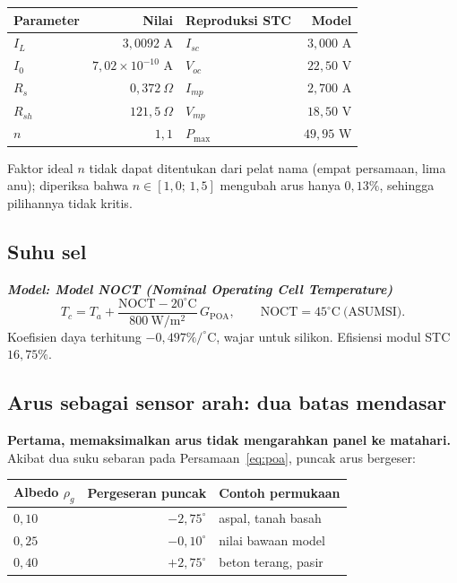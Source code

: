 \documentclass[11pt,a4paper]{article}
\newcommand{\degg}{^\circ}
\newcommand{\model}[1]{\textbf{\textit{Model: #1}}}
\begin{document}
\begin{longtable}{l r l r}
\toprule
\textbf{Parameter} & \textbf{Nilai} & \textbf{Reproduksi STC} & \textbf{Model} \\
\midrule
$I_L$ & $3{,}0092$ A & $I_{sc}$ & $3{,}000$ A \\
$I_0$ & $7{,}02\times10^{-10}$ A & $V_{oc}$ & $22{,}50$ V \\
$R_s$ & $0{,}372\ \Omega$ & $I_{mp}$ & $2{,}700$ A \\
$R_{sh}$ & $121{,}5\ \Omega$ & $V_{mp}$ & $18{,}50$ V \\
$n$ & $1{,}1$ & $P_{\max}$ & $49{,}95$ W \\
\bottomrule
\end{longtable}

Faktor ideal $n$ tidak dapat ditentukan dari pelat nama (empat persamaan, lima anu); diperiksa bahwa
$n \in [1{,}0;\,1{,}5]$ mengubah arus hanya $0{,}13\%$, sehingga pilihannya tidak kritis.

\subsection{Suhu sel}

\model{Model NOCT (Nominal Operating Cell Temperature)}
\begin{equation}
T_c = T_a + \frac{\mathrm{NOCT} - 20\degg\mathrm{C}}{800\ \mathrm{W/m^2}}\, G_{\mathrm{POA}},
\qquad \mathrm{NOCT} = 45\degg\mathrm{C} \ \text{(ASUMSI)}.
\end{equation}
Koefisien daya terhitung $-0{,}497\%/\degg$C, wajar untuk silikon. Efisiensi modul STC $16{,}75\%$.

\subsection{Arus sebagai sensor arah: dua batas mendasar}

\textbf{Pertama, memaksimalkan arus tidak mengarahkan panel ke matahari.} Akibat dua suku sebaran pada
Persamaan~\eqref{eq:poa}, puncak arus bergeser:

\begin{longtable}{l r l}
\toprule
\textbf{Albedo $\rho_g$} & \textbf{Pergeseran puncak} & \textbf{Contoh permukaan} \\
\midrule
$0{,}10$ & $-2{,}75\degg$ & aspal, tanah basah \\
$0{,}25$ & $-0{,}10\degg$ & nilai bawaan model \\
$0{,}40$ & $+2{,}75\degg$ & beton terang, pasir \\
\bottomrule
\end{longtable}
\end{document}
